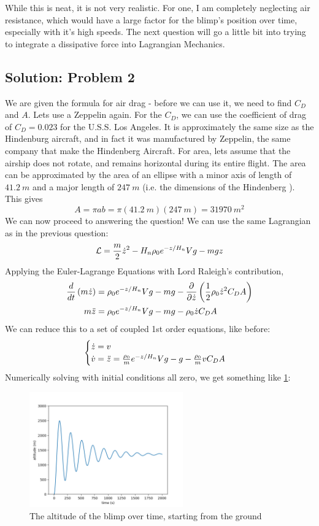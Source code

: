 \documentclass[titlepage]{article}
\begin{document}
While this is neat, it is not very realistic. For one, I am completely neglecting air resistance, which would have a large factor for the blimp's position over time, especially with it's high speeds. The next question will go a little bit into trying to integrate a dissipative force into Lagrangian Mechanics.

\subsection{Solution: Problem 2}

We are given the formula for air drag - before we can use it, we need to find $C_D$ and $A$. Lets use a Zeppelin again. For the $C_D$, we can use the coefficient of drag of $C_D = 0.023$ \cite{usslosangeles} for the U.S.S. Los Angeles. It is approximately the same size as the Hindenburg aircraft, and in fact it was manufactured by Zeppelin, the same company that make the Hindenberg Aircraft. For area, lets assume that the airship does not rotate, and remains horizontal during its entire flight. The area can be approximated by the area of an ellipse with a minor axis of length of $41.2~m$ and a major length of $247~m$ (i.e. the dimensions of the Hindenberg \cite{zeppelin}). This gives
\[
    A = \pi a b = \pi (41.2~m)(247~m) = 31970~m^2
\]
We can now proceed to answering the question! We can use the same Lagrangian as in the previous question:
\[
    \mathcal{L} = {m \over 2} \dot{z}^2 - H_n \rho_0 e^{-z/H_n} V g - mgz
\]
Applying the Euler-Lagrange Equations with Lord Raleigh's contribution,
\[
    \begin{split}
        {d \over dt} \left( m\dot{z} \right) &= \rho_0 e^{-z / H_n} V g - mg - \frac{\partial}{\partial \dot{z}} \left( \frac{1}{2} \rho_0 \dot{z}^{2} C_{D} A \right) \\
        m\ddot{z} &= \rho_0 e^{-z / H_n} V g - mg -  \rho_0 \dot{z} C_{D} A
    \end{split}
\]
We can reduce this to a set of coupled 1st order equations, like before:
\[
    \begin{cases}
        \dot{z} = v \\
        \dot{v} = \ddot{z} = {\rho_0 \over m} e^{-z / H_n} V g - g - \frac{\rho_0}{m} v C_D A
    \end{cases}
\]
Numerically solving with initial conditions all zero, we get something like \ref{fig:damped}:
\begin{figure}[h]
    \centering
    \includegraphics[width=250px]{p2_drag_0.png}
    \caption{The altitude of the blimp over time, starting from the ground}
    \label{fig:damped}
\end{figure}
\end{document}

